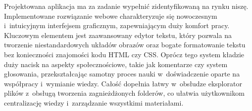 Projektowana aplikacja ma za zadanie wypełnić zidentyfikowaną na rynku niszę. Implementowane rozwiązanie webowe charakteryzuje się 
nowoczesnym i~intuicyjnym interfejsem graficznym, zapewniającym duży komfort pracy. Kluczowym elementem jest zaawansowany edytor tekstu, 
który pozwala na tworzenie niestandardowych układów obrazów oraz bogate formatowanie tekstu bez konieczności znajomości kodu HTML czy CSS.
Oprócz tego system kładzie duży nacisk na aspekty społecznościowe, takie jak komentarze czy system głosowania, przekształcając samotny 
proces nauki w~doświadczenie oparte na współpracy i~wymianie wiedzy. Całość dopełnia łatwy w~obsłudze eksplorator plików z~obsługą 
tworzenia zagnieżdżonych folderów, co ułatwia użytkownikom centralizację wiedzy i~zarządzanie wszystkimi materiałami. 